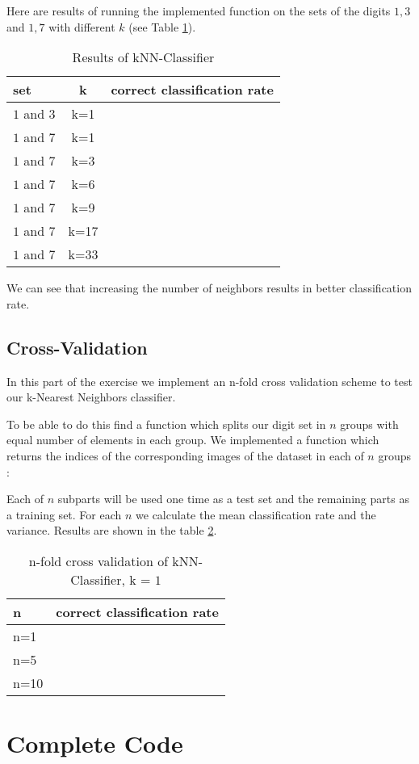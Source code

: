 \documentclass{article}
\begin{document}


Here are results of running the implemented function on the sets of the digits $1, 3$ and $1,7$ with different $k$ (see Table \ref{Tab2}).

\begin{table}[htb]
	\centering
	\begin{tabular}{|l|c|c|}
		\hline
		set & k & correct classification rate\\ \hline
		$1$ and $3$ & k=1 & \\ \hline
		$1$ and $7$ & k=1 & \\ 
		$1$ and $7$ & k=3 & \\ 
		$1$ and $7$ & k=6 & \\ 
		$1$ and $7$ & k=9 & \\ 
		$1$ and $7$ & k=17 & \\ 						
		$1$ and $7$ & k=33 & \\ \hline		
	\end{tabular}
\caption{Results of kNN-Classifier}
\label{Tab2}
\end{table}

We can see that increasing the number of neighbors results in better classification rate.

\subsection{Cross-Validation}
 In this part of the exercise we implement an n-fold cross validation scheme to test our k-Nearest Neighbors classifier.

To be able to do this find a function which splits our digit set in $n$ groups with equal number of elements in each group.
We implemented a function which returns the indices of the corresponding images of the dataset in each of $n$ groups :
 


Each of $n$ subparts will be used one time as a test set and the remaining parts as a training set. For each $n$ we calculate the mean classification rate and the variance. Results are shown in the table \ref{Tab3}.

\begin{table}[htb]
	\centering
	\begin{tabular}{|l|c|}
		\hline
		n & correct classification rate\\ \hline
		n=1 & \\ \hline
		n=5 & \\ \hline
		n=10 & \\ \hline		
	\end{tabular}
\caption{n-fold cross validation of kNN-Classifier, k = $1$}
\label{Tab3}
\end{table}


\section{Complete Code}


\end{document}

